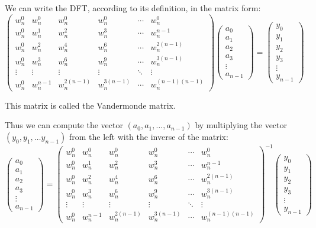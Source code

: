 \documentclass{article}
\begin{document}
We can write the DFT, according to its definition, in the matrix form:
$$ \begin{pmatrix} w_n^0 & w_n^0 & w_n^0 & w_n^0 & \cdots & w_n^0 \\ w_n^0 & w_n^1 & w_n^2 & w_n^3 & \cdots & w_n^{n-1} \\ w_n^0 & w_n^2 & w_n^4 & w_n^6 & \cdots & w_n^{2(n-1)} \\ w_n^0 & w_n^3 & w_n^6 & w_n^9 & \cdots & w_n^{3(n-1)} \\ \vdots & \vdots & \vdots & \vdots & \ddots & \vdots \\ w_n^0 & w_n^{n-1} & w_n^{2(n-1)} & w_n^{3(n-1)} & \cdots & w_n^{(n-1)(n-1)} \end{pmatrix} \begin{pmatrix} a_0 \\ a_1 \\ a_2 \\ a_3 \\ \vdots \\ a_{n-1} \end{pmatrix} = \begin{pmatrix} y_0 \\ y_1 \\ y_2 \\ y_3 \\ \vdots \\ y_{n-1} \end{pmatrix} $$

This matrix is called the Vandermonde matrix.

Thus we can compute the vector $(a_0, a_1, \dots, a_{n-1})$ by multiplying the vector $(y_0, y_1, \dots y_{n-1})$ from the left with the inverse of the matrix:
$$ \begin{pmatrix} a_0 \\ a_1 \\ a_2 \\ a_3 \\ \vdots \\ a_{n-1} \end{pmatrix} = \begin{pmatrix} w_n^0 & w_n^0 & w_n^0 & w_n^0 & \cdots & w_n^0 \\ w_n^0 & w_n^1 & w_n^2 & w_n^3 & \cdots & w_n^{n-1} \\ w_n^0 & w_n^2 & w_n^4 & w_n^6 & \cdots & w_n^{2(n-1)} \\ w_n^0 & w_n^3 & w_n^6 & w_n^9 & \cdots & w_n^{3(n-1)} \\ \vdots & \vdots & \vdots & \vdots & \ddots & \vdots \\ w_n^0 & w_n^{n-1} & w_n^{2(n-1)} & w_n^{3(n-1)} & \cdots & w_n^{(n-1)(n-1)} \end{pmatrix}^{-1} \begin{pmatrix} y_0 \\ y_1 \\ y_2 \\ y_3 \\ \vdots \\ y_{n-1} \end{pmatrix} $$
\end{document}
